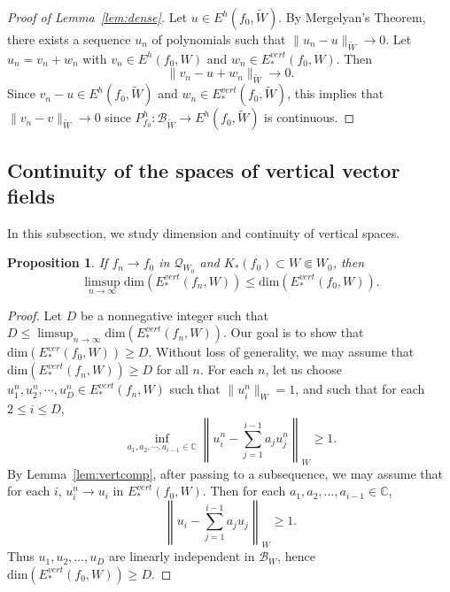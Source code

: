 \documentclass{amsart}
\numberwithin{equation}{section}
\newtheorem{proposition}[theorem]{Proposition}%
\theoremstyle{definition}
\theoremstyle{remark}
\begin{document}
\begin{proof}[Proof of Lemma~\ref{lem:dense}] Let $u\in E^h(f_0, \widetilde{W})$. By Mergelyan's Theorem, there exists a sequence $u_n$ of polynomials such that $\|u_n-u\|_{\widetilde{W}}\to 0$. Let $u_n=v_n+w_n$ with $v_n\in E^h(f_0,W)$ and $w_n\in E^{vert}_*(f_0,W)$. Then 
$$\|v_n-u+w_n\|_{\widetilde{W}}\to 0.$$
Since $v_n-u\in E^h(f_0, \widetilde{W})$ and $w_n\in E^{vert}_*(f_0,\widetilde{W})$, this implies that $\|v_n-v\|_{\widetilde{W}}\to 0$ since $P^h_{f_0}:\mathcal{B}_{\widetilde{W}}\to E^h(f_0,\widetilde{W})$ is continuous.
\end{proof}

\subsection{Continuity of the spaces of vertical vector fields}
In this subsection, we study dimension and continuity of vertical spaces. 





\begin{proposition}\label{prop:lowerbd} If $f_n\to f_0$ in $\mathcal{Q}_{W_0}$ and $K_*(f_0)\subset W\Subset W_0$, then
  $$\limsup_{n\to\infty}\text{dim}(E^{vert}_*(f_n, W))\le \text{dim}(E^{vert}_* (f_0,W)).$$ 
\end{proposition}
\begin{proof} 
Let $D$ be a nonnegative integer such that $D\le \limsup_{n\to\infty} \text{dim}(E^{vert}_*(f_n,W))$. Our goal is to show that $\text{dim}(E^{ver}_*(f_0,W))\ge D$. 
Without loss of generality, we may assume that $\text{dim}(E^{vert}_*(f_n, W))\ge D$ for all $n$.
For each $n$, let us choose $u_1^n, u_2^n,\cdots, u_D^n\in E^{vert}_*(f_n, W)$ such that
$\|u_i^n\|_{W}=1$, and such that for each $2\le i\le D$, 
$$\inf_{a_1, a_2, \cdots, a_{i-1}\in \mathbb{C}}\left\|u_i^n-\sum_{j=1}^{i-1} a_j u_j^n\right\|_{W}\ge 1.$$    
By Lemma~\ref{lem:vertcomp}, after passing to a subsequence, we may assume that for each $i$, $u_i^n\to u_i$ in $E^{vert}_*(f_0,W)$. Then for each $a_1,a_2,\ldots, a_{i-1}\in \mathbb{C}$,
$$\left\|u_i-\sum_{j=1}^{i-1} a_j u_j\right\|_{W}\ge 1.$$  
Thus $u_1, u_2, \dots, u_D$ are linearly independent in $\mathcal{B}_{W}$, hence $\text{dim}(E^{vert}_*(f_0,W))\ge D$. 
\end{proof}
\end{document}
